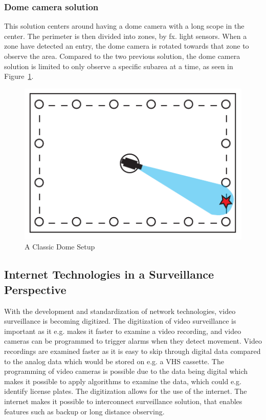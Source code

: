 \subsubsection{Dome camera solution}
This solution centers around having a dome camera with a long scope in the center.
The perimeter is then divided into zones, by fx. light sensors.
When a zone have detected an entry, the dome camera is rotated towards that zone to observe the area.
Compared to the two previous solution, the dome camera solution is limited to only observe a specific subarea at a time, as seen in Figure~\ref{fig:drone_sensor}.
\begin{figure}[htb]
    \centering
    \includegraphics[width=\textwidth]{gfx/drome_sensor.pdf}
    \caption{A Classic Dome Setup}
    \label{fig:drone_sensor}
\end{figure}



\subsection{Internet Technologies in a Surveillance Perspective}
With the development and standardization of network technologies, video surveillance is becoming digitized.
The digitization of video surveillance is important as it e.g. makes it faster to examine a video recording, and video cameras can be programmed to trigger alarms when they detect movement.
Video recordings are examined faster as it is easy to skip through digital data compared to the analog data which would be stored on e.g. a VHS cassette.
The programming of video cameras is possible due to the data being digital which makes it possible to apply algorithms to examine the data, which could e.g. identify license plates.
The digitization allows for the use of the internet.
The internet makes it possible to interconnect surveillance solution, that enables features such as backup or long distance observing.








